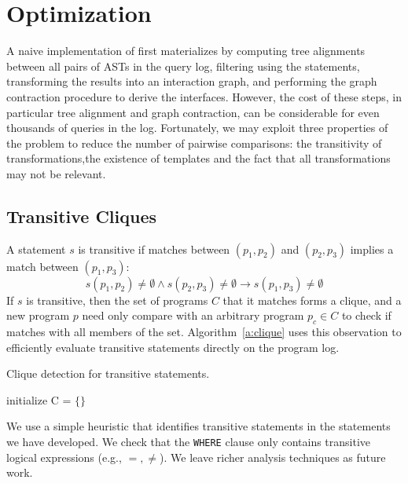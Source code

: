 \section{Optimization}\label{s:opt}

A naive implementation of \sys first materializes \difftable by computing tree alignments between all pairs of ASTs in the query log, filtering \difftable using the \lang statements, transforming the results into an interaction graph, and performing the graph contraction procedure to derive the interfaces.  However, the cost of these steps, in particular tree alignment and graph contraction, can be considerable for even thousands of queries in the log. Fortunately, we may exploit three properties of the problem to reduce the number of pairwise comparisons: the transitivity of transformations,the existence of templates and the fact that all transformations may not be relevant.

\subsection{Transitive \lang Cliques}

\label{transcliques}
A \lang statement $s$ is transitive if matches between $(p_1, p_2)$ and $(p_2,p_3)$ implies a match between $(p_1,p_3)$:
{
  $$s(p_1, p_2) \ne \emptyset \wedge s(p_2, p_3) \ne \emptyset \rightarrow s(p_1, p_3) \ne \emptyset$$
}
If $s$ is transitive, then the set of programs $C$ that it matches forms a clique, and a new program $p$ need only compare with an arbitrary program $p_c\in C$ to check if matches with all members of the set.  Algorithm~\ref{a:clique} uses this observation to efficiently evaluate transitive \lang statements directly on the program log.
{\small
\begin{algorithm}
 \caption{Clique detection for transitive \lang statements.}
 \label{a:clique}
 initialize C = $\{\}$\;
\end{algorithm}
}

We use a simple heuristic that identifies transitive statements in the \lang statements we have developed.  We check that the \texttt{WHERE} clause only contains transitive logical expressions (e.g., $=, \ne$).  We leave richer analysis techniques as future work.

